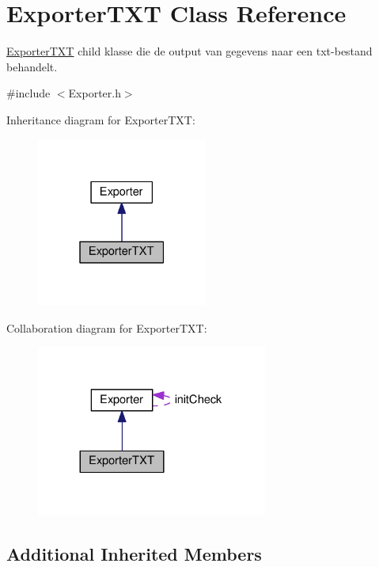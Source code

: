 \hypertarget{class_exporter_t_x_t}{}\section{Exporter\+T\+XT Class Reference}
\label{class_exporter_t_x_t}


\hyperlink{class_exporter_t_x_t}{Exporter\+T\+XT} child klasse die de output van gegevens naar een txt-\/bestand behandelt.  




{\ttfamily \#include $<$Exporter.\+h$>$}



Inheritance diagram for Exporter\+T\+XT\+:
\nopagebreak
\begin{figure}[H]
\begin{center}
\leavevmode
\includegraphics[width=159pt]{class_exporter_t_x_t__inherit__graph}
\end{center}
\end{figure}


Collaboration diagram for Exporter\+T\+XT\+:
\nopagebreak
\begin{figure}[H]
\begin{center}
\leavevmode
\includegraphics[width=215pt]{class_exporter_t_x_t__coll__graph}
\end{center}
\end{figure}
\subsection*{Additional Inherited Members}


